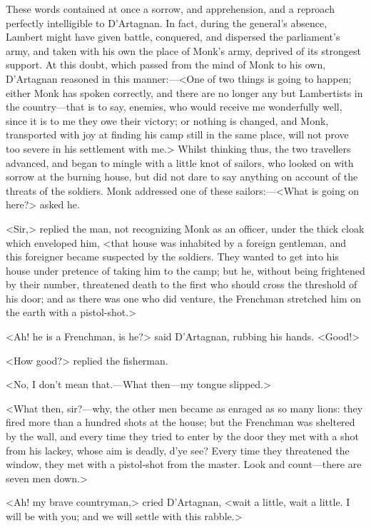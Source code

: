 These words contained at once a sorrow, and apprehension, and a reproach perfectly intelligible to D'Artagnan. In fact, during the general's absence, Lambert might have given battle, conquered, and dispersed the parliament's army, and taken with his own the place of Monk's army, deprived of its strongest support. At this doubt, which passed from the mind of Monk to his own, D'Artagnan reasoned in this manner:—<One of two things is going to happen; either Monk has spoken correctly, and there are no longer any but Lambertists in the country—that is to say, enemies, who would receive me wonderfully well, since it is to me they owe their victory; or nothing is changed, and Monk, transported with joy at finding his camp still in the same place, will not prove too severe in his settlement with me.> Whilst thinking thus, the two travellers advanced, and began to mingle with a little knot of sailors, who looked on with sorrow at the burning house, but did not dare to say anything on account of the threats of the soldiers. Monk addressed one of these sailors:—<What is going on here?> asked he.

<Sir,> replied the man, not recognizing Monk as an officer, under the thick cloak which enveloped him, <that house was inhabited by a foreign gentleman, and this foreigner became suspected by the soldiers. They wanted to get into his house under pretence of taking him to the camp; but he, without being frightened by their number, threatened death to the first who should cross the threshold of his door; and as there was one who did venture, the Frenchman stretched him on the earth with a pistol-shot.>

<Ah! he is a Frenchman, is he?> said D'Artagnan, rubbing his hands. <Good!>

<How good?> replied the fisherman.

<No, I don't mean that.—What then—my tongue slipped.>

<What then, sir?—why, the other men became as enraged as so many lions: they fired more than a hundred shots at the house; but the Frenchman was sheltered by the wall, and every time they tried to enter by the door they met with a shot from his lackey, whose aim is deadly, d'ye see? Every time they threatened the window, they met with a pistol-shot from the master. Look and count—there are seven men down.>

<Ah! my brave countryman,> cried D'Artagnan, <wait a little, wait a little. I will be with you; and we will settle with this rabble.>

